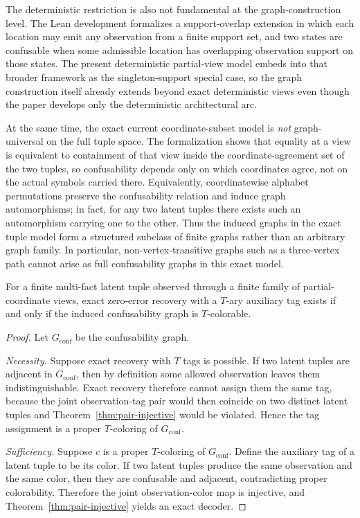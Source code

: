 The deterministic restriction is also not fundamental at the graph-construction level. The Lean development formalizes a support-overlap extension in which each location may emit any observation from a finite support set, and two states are confusable when some admissible location has overlapping observation support on those states. The present deterministic partial-view model embeds into that broader framework as the singleton-support special case, so the graph construction itself already extends beyond exact deterministic views even though the paper develops only the deterministic architectural arc.

At the same time, the exact current coordinate-subset model is \emph{not} graph-universal on the full tuple space. The formalization shows that equality at a view is equivalent to containment of that view inside the coordinate-agreement set of the two tuples, so confusability depends only on which coordinates agree, not on the actual symbols carried there. Equivalently, coordinatewise alphabet permutations preserve the confusability relation and induce graph automorphisms; in fact, for any two latent tuples there exists such an automorphism carrying one to the other. Thus the induced graphs in the exact tuple model form a structured subclass of finite graphs rather than an arbitrary graph family. In particular, non-vertex-transitive graphs such as a three-vertex path cannot arise as full confusability graphs in this exact model.

\begin{theorem}\label{thm:multifact-colorability}
For a finite multi-fact latent tuple observed through a finite family of partial-coordinate views, exact zero-error recovery with a $T$-ary auxiliary tag exists if and only if the induced confusability graph is $T$-colorable.
\end{theorem}

\begin{proof}
Let $G_{\mathrm{conf}}$ be the confusability graph.

\emph{Necessity.} Suppose exact recovery with $T$ tags is possible. If two latent tuples are adjacent in $G_{\mathrm{conf}}$, then by definition some allowed observation leaves them indistinguishable. Exact recovery therefore cannot assign them the same tag, because the joint observation-tag pair would then coincide on two distinct latent tuples and Theorem~\ref{thm:pair-injective} would be violated. Hence the tag assignment is a proper $T$-coloring of $G_{\mathrm{conf}}$.

\emph{Sufficiency.} Suppose $c$ is a proper $T$-coloring of $G_{\mathrm{conf}}$. Define the auxiliary tag of a latent tuple to be its color. If two latent tuples produce the same observation and the same color, then they are confusable and adjacent, contradicting proper colorability. Therefore the joint observation-color map is injective, and Theorem~\ref{thm:pair-injective} yields an exact decoder.
\end{proof}

